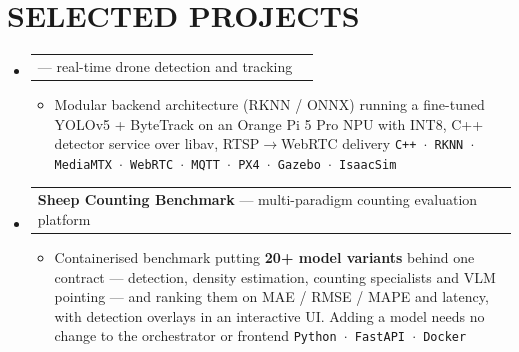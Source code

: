 \documentclass[letterpaper,10pt]{article}
\makeatletter
\newcommand{\myuline}[1]{%
  \uline{\phantom{#1}}%
  \llap{\contour{white}{#1}}%
}
\newcommand{\resumeItem}[1]{
  \item\small{
    {#1 \vspace{-1pt}}
  }
}
\newcommand{\resumeProjectHeading}[2]{
    \item
    \begin{tabular*}{\textwidth}{l@{\extracolsep{\fill}}r}
      #1 & {\color{dark-grey}\small #2} \\
    \end{tabular*}\vspace{-4pt}
}
\newcommand{\resumeSubHeadingListStart}{\begin{itemize}[leftmargin=0in, label={}]}
\newcommand{\resumeSubHeadingListEnd}{\end{itemize}}
\newcommand{\resumeItemListStart}{\begin{itemize}}
\newcommand{\resumeItemListEnd}{\end{itemize}\vspace{0pt}}
\newcommand{\stack}[1]{{\color{dark-grey}\small \texttt{#1}}}
\newcommand{\link}[2]{\href{#1}{\myuline{#2}}}
\makeatother
\begin{document}
\section{SELECTED PROJECTS}
    \resumeSubHeadingListStart

      \resumeProjectHeading
          {\textbf{\link{https://ibrahim-khadraoui-portfolio-seven.vercel.app/projects/atc}{ATC}} --- real-time drone detection and tracking}{}
          \resumeItemListStart
            \resumeItem{Modular backend architecture (RKNN / ONNX) running a fine-tuned YOLOv5 + ByteTrack on an Orange Pi 5 Pro NPU with INT8, C++ detector service over libav, RTSP$\rightarrow$WebRTC delivery \stack{C++ $\cdot$ RKNN $\cdot$ MediaMTX $\cdot$ WebRTC $\cdot$ MQTT $\cdot$ PX4 $\cdot$ Gazebo $\cdot$ IsaacSim}}
          \resumeItemListEnd

      \resumeProjectHeading
          {\textbf{Sheep Counting Benchmark} --- multi-paradigm counting evaluation platform}{}
          \resumeItemListStart
            \resumeItem{Containerised benchmark putting \textbf{20+ model variants} behind one contract --- detection, density estimation, counting specialists and VLM pointing --- and ranking them on MAE / RMSE / MAPE and latency, with detection overlays in an interactive UI. Adding a model needs no change to the orchestrator or frontend \stack{Python $\cdot$ FastAPI $\cdot$ Docker}}
          \resumeItemListEnd

    \resumeSubHeadingListEnd
\vspace{-6pt}

\end{document}
